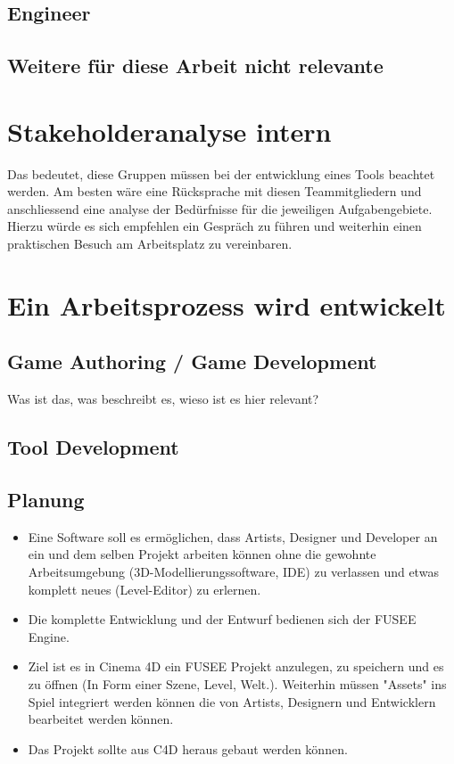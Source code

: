 \documentclass[pagesize, paper=a4, fontsize=12pt,titlepage=true, headings=small, headnosepline, abstractoff, liststotoc, nochapterprefix, plainheadsepline, twoside]{scrreprt}
\begin{document}
\subsection{Engineer}
\subsection{Weitere für diese Arbeit nicht relevante}


\section{Stakeholderanalyse intern}
Das bedeutet, diese Gruppen müssen bei der entwicklung eines Tools beachtet werden. Am besten wäre eine Rücksprache mit diesen Teammitgliedern und anschliessend eine analyse der Bedürfnisse für die jeweiligen Aufgabengebiete. Hierzu würde es sich empfehlen ein Gespräch zu führen und weiterhin einen praktischen Besuch am Arbeitsplatz zu vereinbaren.

\section{Ein Arbeitsprozess wird entwickelt}
\subsection{Game Authoring / Game Development}
Was ist das, was beschreibt es, wieso ist es hier relevant?
\subsection{Tool Development}

\subsection{Planung}
\begin{itemize}
\item Eine Software soll es ermöglichen, dass Artists, Designer und Developer an ein und dem selben Projekt arbeiten können ohne die gewohnte Arbeitsumgebung (3D-Modellierungssoftware, IDE) zu verlassen und etwas komplett neues (Level-Editor) zu erlernen.
\item Die komplette Entwicklung und der Entwurf bedienen sich der FUSEE Engine.
\item Ziel ist es in Cinema 4D ein FUSEE Projekt anzulegen, zu speichern und es zu öffnen (In Form einer Szene, Level, Welt.). Weiterhin müssen "Assets" ins Spiel integriert werden können die von Artists, Designern und Entwicklern bearbeitet werden können.
\item Das Projekt sollte aus C4D heraus gebaut werden können.
\end{itemize}
\end{document}

